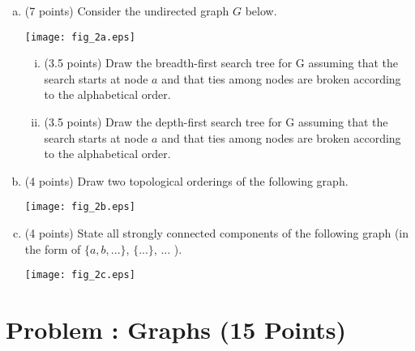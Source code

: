 \documentclass[12pt]{amsart}
\newcounter{pNum}
\newcommand{\problem}[2]{\addtocounter{pNum}{1}
\section*{Problem \arabic{pNum}: #1 (#2 Points)}}
\begin{document}
\begin{enumerate}[(a)]
\item (7 points)
Consider the undirected graph $G$ below.

\smallskip
\begin{center}
\texttt{[image: fig\_2a.eps]}
\end{center}

\smallskip
\begin{enumerate}[(i)]
\item (3.5 points)
Draw the breadth-first search tree for G assuming that the search starts at node $a$ and that ties among nodes are broken according to the alphabetical order.


\vfill
\item (3.5 points)
Draw the depth-first search tree for G assuming that the search starts at node $a$ and that ties among nodes are broken according to the alphabetical order.

\vfill

\end{enumerate}



\newpage
\item (4 points)
Draw two topological orderings of the following graph.

\vspace{2mm}

\begin{center}
\texttt{[image: fig\_2b.eps]}
\end{center}

\vfill

\item (4 points)
State all strongly connected components of the following graph (in the form of $\{a,b,...\}$, $\{...\}$, ... ).
\vspace{2mm}

\begin{center}
\texttt{[image: fig\_2c.eps]}
\end{center}

\vfill

\end{enumerate}


\newpage



\problem{Graphs}{15}
\end{document}
